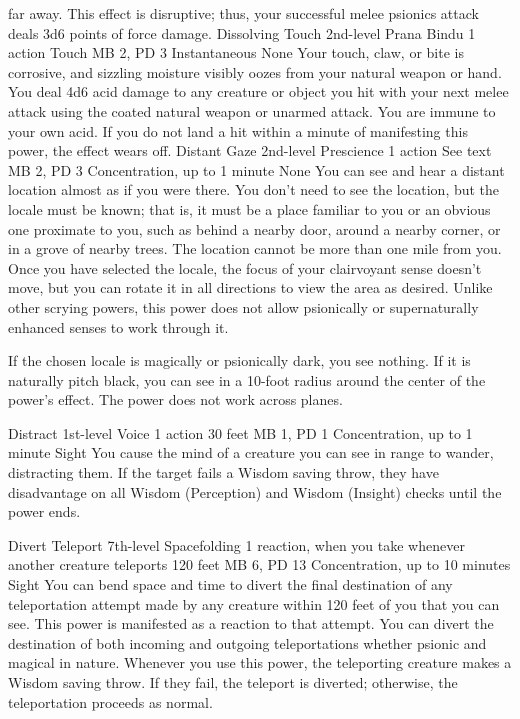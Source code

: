 far away. This effect is disruptive; thus, your successful
melee psionics attack deals 3d6 points of force damage.
\DndPowerHeader%
    {Dissolving Touch\label{pwr:dissolving_touch}}
    {2nd-level Prana Bindu}
    {1 action}
    {Touch}
    {MB 2, PD 3}
    {Instantaneous}
    {None}
Your touch, claw, or bite is corrosive, and
sizzling moisture visibly oozes from your natural weapon or
hand. You deal 4d6 acid damage to any creature or object you
hit with your next melee attack using the coated natural weapon
or unarmed attack. You are immune to your own acid. If you
do not land a hit within a minute of manifesting this power,
the effect wears off.
\DndPowerHeader%
    {Distant Gaze\label{pwr:distant_gaze}}
    {2nd-level Prescience}
    {1 action}
    {See text}
    {MB 2, PD 3}
    {Concentration, up to 1 minute}
    {None}
You can see and hear a distant location almost
as if you were there. You don't need to see the location,
but the locale must be known; that is, it must be a place
familiar to you or an obvious one proximate to you, such as
behind a nearby door, around a nearby corner, or in a grove
of nearby trees.
The location cannot be more than one mile from you.
Once you have selected the locale, the focus
of your clairvoyant sense doesn't move, but you can rotate
it in all directions to view the area as desired. Unlike other
scrying powers, this power does not allow psionically
or supernaturally enhanced senses to work through it.

If the chosen locale is magically or psionically dark, you
see nothing. If it is naturally pitch black, you can see in
a 10-foot radius around the center of the power's effect.
The power does not work across planes.

\DndPowerHeader%
    {Distract\label{pwr:distract}}
    {1st-level Voice}
    {1 action}
    {30 feet}
    {MB 1, PD 1}
    {Concentration, up to 1 minute}
    {Sight}
You cause the mind of a creature
you can see in range to wander, distracting them. If the target
fails a Wisdom saving throw, they have disadvantage on all
Wisdom (Perception) and Wisdom (Insight) checks until the
power ends.

\DndPowerHeader%
    {Divert Teleport\label{pwr:divert_teleport}}
    {7th-level Spacefolding}
    {1 reaction, when you take whenever another creature teleports}
    {120 feet}
    {MB 6, PD 13}
    {Concentration, up to 10 minutes}
    {Sight}
You can bend space and time to divert the
final destination of any teleportation attempt made by any
creature within 120 feet of you that you can see.
This power is manifested as a reaction to that attempt.
You can divert the destination of both incoming and outgoing
teleportations whether psionic and magical in nature. Whenever you use this
power, the teleporting creature makes a Wisdom saving throw.
If they fail, the teleport is diverted; otherwise, the teleportation
proceeds as normal.


